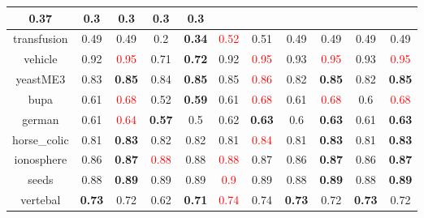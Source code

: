 \documentclass{article}%
\begin{document}
\begin{tabular}{c|cccccccccc}
{0.37
}&0.3&0.3&0.3&0.3\\%
\hline%
transfusion&0.49&0.49&0.2&\textbf{0.34}&\textcolor{red}{ 
0.52
}&0.51&0.49&0.49&0.49&0.49\\%
\hline%
vehicle&0.92&\textcolor{red}{ 
0.95
}&0.71&\textbf{0.72}&0.92&\textcolor{red}{ 
0.95
}&0.93&\textcolor{red}{ 
0.95
}&0.93&\textcolor{red}{ 
0.95
}\\%
\hline%
yeastME3&0.83&\textbf{0.85}&0.84&\textbf{0.85}&0.85&\textcolor{red}{ 
0.86
}&0.82&\textbf{0.85}&0.82&\textbf{0.85}\\%
\hline%
bupa&0.61&\textcolor{red}{ 
0.68
}&0.52&\textbf{0.59}&0.61&\textcolor{red}{ 
0.68
}&0.61&\textcolor{red}{ 
0.68
}&0.6&\textcolor{red}{ 
0.68
}\\%
\hline%
german&0.61&\textcolor{red}{ 
0.64
}&\textbf{0.57}&0.5&0.62&\textbf{0.63}&0.6&\textbf{0.63}&0.61&\textbf{0.63}\\%
\hline%
horse\_colic&0.81&\textbf{0.83}&0.82&0.82&0.81&\textcolor{red}{ 
0.84
}&0.81&\textbf{0.83}&0.81&\textbf{0.83}\\%
\hline%
ionosphere&0.86&\textbf{0.87}&\textcolor{red}{ 
0.88
}&0.88&\textcolor{red}{ 
0.88
}&0.87&0.86&\textbf{0.87}&0.86&\textbf{0.87}\\%
\hline%
seeds&0.88&\textbf{0.89}&0.89&0.89&\textcolor{red}{ 
0.9
}&0.89&0.88&\textbf{0.89}&0.88&\textbf{0.89}\\%
\hline%
vertebal&\textbf{0.73}&0.72&0.62&\textbf{0.71}&\textcolor{red}{ 
0.74
}&0.74&\textbf{0.73}&0.72&\textbf{0.73}&0.72\\%
\hline%
\end{tabular}

%
\end{document}
